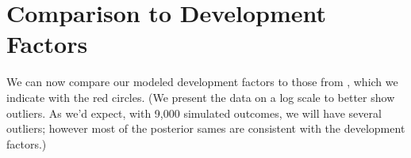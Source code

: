 \documentclass[
  letterpaper,
  DIV=11,
  numbers=noendperiod]{scrartcl}
\newenvironment{Shaded}{\begin{snugshade}}{\end{snugshade}}
\newcommand{\DecValTok}[1]{\textcolor[rgb]{0.68,0.00,0.00}{#1}}
\newcommand{\FloatTok}[1]{\textcolor[rgb]{0.68,0.00,0.00}{#1}}
\newcommand{\FunctionTok}[1]{\textcolor[rgb]{0.28,0.35,0.67}{#1}}
\newcommand{\NormalTok}[1]{\textcolor[rgb]{0.00,0.23,0.31}{#1}}
\newcommand{\OtherTok}[1]{\textcolor[rgb]{0.00,0.23,0.31}{#1}}
\newcommand{\SpecialCharTok}[1]{\textcolor[rgb]{0.37,0.37,0.37}{#1}}
\begin{document}
\begin{Shaded}
\end{Shaded}

\section{\texorpdfstring{Comparison to \bs Development
Factors}{Comparison to Development Factors}}\label{comparison-to-development-factors}

We can now compare our modeled development factors to those from \bs,
which we indicate with the red circles. (We present the data on a log
scale to better show outliers. As we'd expect, with 9,000 simulated
outcomes, we will have several outliers; however most of the posterior
sames are consistent with the \bs development factors.)
\end{document}
